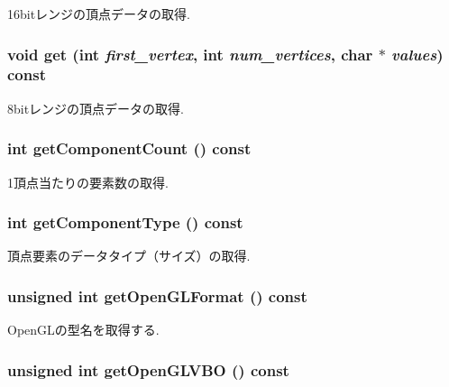16bitレンジの頂点データの取得. \hypertarget{classm3g_1_1VertexArray_9d1b801a7c196a07553a5ef4a5473573}{
\subsubsection[{get}]{\setlength{\rightskip}{0pt plus 5cm}void get (int {\em first\_\-vertex}, \/  int {\em num\_\-vertices}, \/  char $\ast$ {\em values}) const}}
\label{classm3g_1_1VertexArray_9d1b801a7c196a07553a5ef4a5473573}


8bitレンジの頂点データの取得. \hypertarget{classm3g_1_1VertexArray_7016f51d2788e78fdd736efd040f5e5e}{
\subsubsection[{getComponentCount}]{\setlength{\rightskip}{0pt plus 5cm}int getComponentCount () const}}
\label{classm3g_1_1VertexArray_7016f51d2788e78fdd736efd040f5e5e}


1頂点当たりの要素数の取得. \hypertarget{classm3g_1_1VertexArray_9b7b78fbff0603779ec6bdd2a323c939}{
\subsubsection[{getComponentType}]{\setlength{\rightskip}{0pt plus 5cm}int getComponentType () const}}
\label{classm3g_1_1VertexArray_9b7b78fbff0603779ec6bdd2a323c939}


頂点要素のデータタイプ（サイズ）の取得. \hypertarget{classm3g_1_1VertexArray_3e28ae5596cde78a980de02005a136f2}{
\subsubsection[{getOpenGLFormat}]{\setlength{\rightskip}{0pt plus 5cm}unsigned int getOpenGLFormat () const}}
\label{classm3g_1_1VertexArray_3e28ae5596cde78a980de02005a136f2}


OpenGLの型名を取得する. \hypertarget{classm3g_1_1VertexArray_720ecee697dbf11d5f90dc998817b39d}{
\subsubsection[{getOpenGLVBO}]{\setlength{\rightskip}{0pt plus 5cm}unsigned int getOpenGLVBO () const}}
\label{classm3g_1_1VertexArray_720ecee697dbf11d5f90dc998817b39d}


